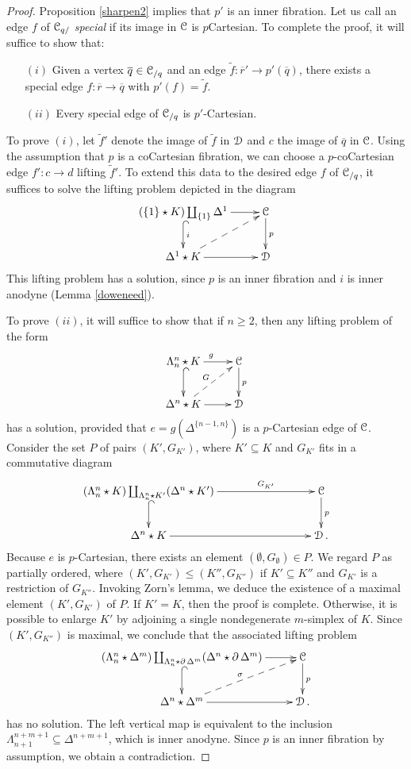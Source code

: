 \begin{proof}
Proposition \ref{sharpen2} implies that $p'$ is an inner fibration. Let us call an edge
$f$ of $\operatorname{\mathcal{C}}_{q/}$ {\it special} if its image in $\operatorname{\mathcal{C}}$ is $p$Cartesian. To complete the proof, it will suffice to show that:
\begin{itemize}
\item[$(i)$] Given a vertex $\overline{q} \in \operatorname{\mathcal{C}}_{/q}$ and an edge
$\widetilde{f}: \overline{r}' \rightarrow p'( \overline{q} )$, there exists a special edge
$f: \overline{r} \rightarrow \overline{q}$ with $p'(f) = \widetilde{f}$. 
\item[$(ii)$] Every special edge of $\operatorname{\mathcal{C}}_{/q}$ is $p'$-Cartesian.
\end{itemize}

To prove $(i)$, let $\widetilde{f}'$ denote the image of $\widetilde{f}$ in $\operatorname{\mathcal{D}}$ and
$c$ the image of $\overline{q}$ in $\operatorname{\mathcal{C}}$. Using the assumption that $p$ is a coCartesian fibration, we can choose a $p$-coCartesian edge $f': c \rightarrow d$ lifting $\widetilde{f}'$. To extend this data to the desired edge $f$ of $\operatorname{\mathcal{C}}_{/q}$, it suffices to solve the lifting problem depicted in the diagram
$$ \xymatrix{ (\{1\} \star K) \coprod_{ \{1\} } \Delta^1 \ar[r] \ar@{^{(}->}[d]^{i} & \calC \ar[d]^{p} \\
\Delta^1 \star K  \ar[r] \ar@{-->}[ur] & \calD }$$
This lifting problem has a solution, since $p$ is an inner fibration and $i$ is inner anodyne (Lemma \ref{doweneed}).

To prove $(ii)$, it will suffice to show that if $n \geq 2$, then any lifting problem of the form
$$ \xymatrix{ \Lambda^n_n \star K \ar[r]^{g} \ar@{^{(}->}[d] & \calC \ar[d]^{p} \\
\Delta^n \star K \ar[r] \ar@{-->}[ur]^{G} & \calD }$$
has a solution, provided that $e=g( \Delta^{ \{n-1,n\} })$ is a $p$-Cartesian edge of $\operatorname{\mathcal{C}}$.
Consider the set $P$ of pairs $(K', G_{K'})$, where $K' \subseteq K$ and $G_{K'}$ fits in a commutative diagram 
$$ \xymatrix{ (\Lambda^n_n \star K) \coprod_{ \Lambda^n_n \star K'} (\Delta^n \star K') \ar[rrr]^-{G_{K'}} \ar@{^{(}->}[d] & & & \calC \ar[d]^{p} \\
\Delta^n \star K \ar[rrr] & & & \calD. }$$
Because $e$ is $p$-Cartesian, there exists an element
$(\emptyset, G_{\emptyset} ) \in P$. We regard $P$ as partially ordered, where
$(K', G_{K'} ) \leq (K'', G_{K''})$ if $K' \subseteq K''$ and $G_{K'}$ is a restriction of $G_{K''}$.
Invoking Zorn's lemma, we deduce the existence of a maximal element $(K', G_{K'})$ of $P$.
If $K' = K$, then the proof is complete. Otherwise, it is possible to enlarge $K'$ by adjoining a single nondegenerate $m$-simplex of $K$. Since $(K', G_{K''})$ is maximal, we conclude that the associated lifting problem
$$ \xymatrix{ (\Lambda^n_n \star \Delta^m) \coprod_{\Lambda^n_n \star \bd \Delta^m} (\Delta^n \star \bd \Delta^m) \ar[r] \ar@{^{(}->}[d] & \calC \ar[d]^{p} \\
\Delta^n \star \Delta^m \ar[r] \ar@{-->}[ur]^{\sigma} & \calD. }$$
has no solution.
The left vertical map is equivalent to the inclusion $\Lambda^{n+m+1}_{n+1} \subseteq \Delta^{n+m+1}$, which is inner anodyne. Since $p$ is an inner fibration by assumption, we obtain a contradiction.
\end{proof}

